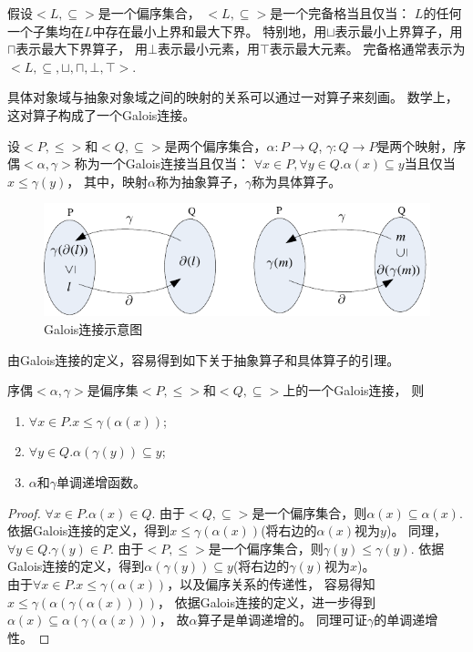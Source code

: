 \begin{definition}
假设$<L, \subseteq>$是一个偏序集合，
$<L, \subseteq>$是一个完备格当且仅当：
$L$的任何一个子集均在$L$中存在最小上界和最大下界。
特别地，用$\sqcup$表示最小上界算子，用$\sqcap$表示最大下界算子，
用$\bot$表示最小元素，用$\top$表示最大元素。
完备格通常表示为$<L, \subseteq, \sqcup, \sqcap, \bot, \top>$.
\end{definition}


具体对象域与抽象对象域之间的映射的关系可以通过一对算子来刻画。
数学上，这对算子构成了一个Galois连接。


\begin{definition}
设$<P, \leq>$和$<Q, \subseteq>$是两个偏序集合，$\alpha:P \rightarrow Q$,
$\gamma: Q \rightarrow P$是两个映射，序偶$<\alpha, \gamma>$称为一个Galois连接当且仅当：
$\forall x\in P, \forall y\in Q. \alpha(x) \subseteq y$当且仅当$x\leq \gamma(y)$，
其中，映射$\alpha$称为抽象算子，$\gamma$称为具体算子。
\end{definition}

\begin{figure}[h]
\centering
\includegraphics{figures/chap04/galois.pdf}
\caption{Galois连接示意图}
\label{fig-galois}
\end{figure}

由Galois连接的定义，容易得到如下关于抽象算子和具体算子的引理。

\begin{lemma}
序偶$<\alpha, \gamma>$是偏序集$<P, \leq>$和$<Q, \subseteq>$上的一个Galois连接， 则
\begin{enumerate}
\item $\forall x\in P. x \leq \gamma(\alpha(x))$;
\item $\forall y\in Q. \alpha(\gamma(y)) \subseteq y$;
\item $\alpha$和$\gamma$单调递增函数。
\end{enumerate}
\end{lemma}
	
\begin{proof}
$\forall x\in P. \alpha(x) \in Q$. 
由于$<Q, \subseteq>$是一个偏序集合，则$\alpha(x) \subseteq \alpha(x)$.
依据Galois连接的定义，得到$ x \leq \gamma(\alpha(x))$(将右边的$\alpha(x)$视为$y$)。
同理，$\forall y \in Q. \gamma(y) \in P$.
由于$<P, \leq>$是一个偏序集合，则$\gamma(y) \leq \gamma(y)$.
依据Galois连接的定义，得到$\alpha(\gamma(y)) \subseteq y$(将右边的$\gamma(y)$视为$x$)。\\
由于$\forall x\in P. x\leq \gamma(\alpha(x))$，以及偏序关系的传递性，
容易得知$ x\leq \gamma(\alpha(\gamma(\alpha(x))))$，
依据Galois连接的定义，进一步得到$\alpha(x)\subseteq \alpha(\gamma(\alpha(x)))$，
故$\alpha$算子是单调递增的。
同理可证$\gamma$的单调递增性。
\end{proof}


